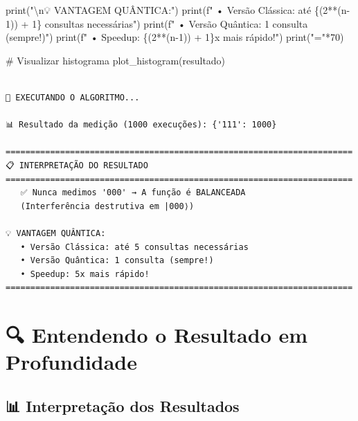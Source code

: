 \documentclass[
  brazilian,
]{report}
\newenvironment{Shaded}{\begin{snugshade}}{\end{snugshade}}
\newcommand{\BuiltInTok}[1]{\textcolor[rgb]{0.00,0.23,0.31}{#1}}
\newcommand{\CharTok}[1]{\textcolor[rgb]{0.13,0.47,0.30}{#1}}
\newcommand{\CommentTok}[1]{\textcolor[rgb]{0.37,0.37,0.37}{#1}}
\newcommand{\DecValTok}[1]{\textcolor[rgb]{0.68,0.00,0.00}{#1}}
\newcommand{\NormalTok}[1]{\textcolor[rgb]{0.00,0.23,0.31}{#1}}
\newcommand{\OperatorTok}[1]{\textcolor[rgb]{0.37,0.37,0.37}{#1}}
\newcommand{\SpecialCharTok}[1]{\textcolor[rgb]{0.37,0.37,0.37}{#1}}
\newcommand{\SpecialStringTok}[1]{\textcolor[rgb]{0.13,0.47,0.30}{#1}}
\newcommand{\StringTok}[1]{\textcolor[rgb]{0.13,0.47,0.30}{#1}}
\begin{document}
\begin{tcolorbox}
\begin{Shaded}
\begin{Highlighting}[]
\BuiltInTok{print}\NormalTok{(}\StringTok{"}\CharTok{\textbackslash{}n}\StringTok{💡 VANTAGEM QUÂNTICA:"}\NormalTok{)}
\BuiltInTok{print}\NormalTok{(}\SpecialStringTok{f"   • Versão Clássica: até }\SpecialCharTok{\{}\NormalTok{(}\DecValTok{2}\OperatorTok{**}\NormalTok{(n}\OperatorTok{{-}}\DecValTok{1}\NormalTok{)) }\OperatorTok{+} \DecValTok{1}\SpecialCharTok{\}}\SpecialStringTok{ consultas necessárias"}\NormalTok{)}
\BuiltInTok{print}\NormalTok{(}\SpecialStringTok{f"   • Versão Quântica: 1 consulta (sempre!)"}\NormalTok{)}
\BuiltInTok{print}\NormalTok{(}\SpecialStringTok{f"   • Speedup: }\SpecialCharTok{\{}\NormalTok{(}\DecValTok{2}\OperatorTok{**}\NormalTok{(n}\OperatorTok{{-}}\DecValTok{1}\NormalTok{)) }\OperatorTok{+} \DecValTok{1}\SpecialCharTok{\}}\SpecialStringTok{x mais rápido!"}\NormalTok{)}
\BuiltInTok{print}\NormalTok{(}\StringTok{"="}\OperatorTok{*}\DecValTok{70}\NormalTok{)}
    
\CommentTok{\# Visualizar histograma}
\NormalTok{plot\_histogram(resultado)}
\end{Highlighting}
\end{Shaded}

\end{tcolorbox}

\begin{verbatim}

🚀 EXECUTANDO O ALGORITMO...

📊 Resultado da medição (1000 execuções): {'111': 1000}

======================================================================
📋 INTERPRETAÇÃO DO RESULTADO
======================================================================
   ✅ Nunca medimos '000' → A função é BALANCEADA
   (Interferência destrutiva em |000⟩)

💡 VANTAGEM QUÂNTICA:
   • Versão Clássica: até 5 consultas necessárias
   • Versão Quântica: 1 consulta (sempre!)
   • Speedup: 5x mais rápido!
======================================================================
\end{verbatim}

\section{🔍 Entendendo o Resultado em
Profundidade}\label{entendendo-o-resultado-em-profundidade}

\subsection{📊 Interpretação dos
Resultados}\label{interpretauxe7uxe3o-dos-resultados}
\end{document}
